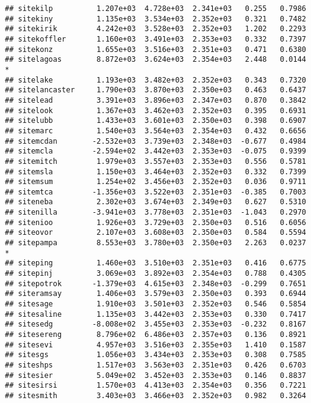 \documentclass[
]{article}
\begin{document}
\begin{verbatim}
## sitekilp          1.207e+03  4.728e+03  2.341e+03   0.255   0.7986  
## sitekiny          1.135e+03  3.534e+03  2.352e+03   0.321   0.7482  
## sitekirik         4.242e+03  3.528e+03  2.352e+03   1.202   0.2293  
## sitekoffler       1.160e+03  3.491e+03  2.353e+03   0.332   0.7397  
## sitekonz          1.655e+03  3.516e+03  2.351e+03   0.471   0.6380  
## sitelagoas        8.872e+03  3.624e+03  2.354e+03   2.448   0.0144 *
## sitelake          1.193e+03  3.482e+03  2.352e+03   0.343   0.7320  
## sitelancaster     1.790e+03  3.870e+03  2.350e+03   0.463   0.6437  
## sitelead          3.391e+03  3.896e+03  2.347e+03   0.870   0.3842  
## sitelook          1.367e+03  3.462e+03  2.352e+03   0.395   0.6931  
## sitelubb          1.433e+03  3.601e+03  2.350e+03   0.398   0.6907  
## sitemarc          1.540e+03  3.564e+03  2.354e+03   0.432   0.6656  
## sitemcdan        -2.532e+03  3.739e+03  2.348e+03  -0.677   0.4984  
## sitemcla         -2.594e+02  3.442e+03  2.353e+03  -0.075   0.9399  
## sitemitch         1.979e+03  3.557e+03  2.353e+03   0.556   0.5781  
## sitemsla          1.150e+03  3.464e+03  2.352e+03   0.332   0.7399  
## sitemsum          1.254e+02  3.456e+03  2.352e+03   0.036   0.9711  
## sitemtca         -1.356e+03  3.522e+03  2.351e+03  -0.385   0.7003  
## siteneba          2.302e+03  3.674e+03  2.349e+03   0.627   0.5310  
## sitenilla        -3.941e+03  3.778e+03  2.351e+03  -1.043   0.2970  
## sitenioo          1.926e+03  3.729e+03  2.350e+03   0.516   0.6056  
## siteovor          2.107e+03  3.608e+03  2.350e+03   0.584   0.5594  
## sitepampa         8.553e+03  3.780e+03  2.350e+03   2.263   0.0237 *
## siteping          1.460e+03  3.510e+03  2.351e+03   0.416   0.6775  
## sitepinj          3.069e+03  3.892e+03  2.354e+03   0.788   0.4305  
## sitepotrok       -1.379e+03  4.615e+03  2.348e+03  -0.299   0.7651  
## siteramsay        1.406e+03  3.579e+03  2.350e+03   0.393   0.6944  
## sitesage          1.910e+03  3.501e+03  2.352e+03   0.546   0.5854  
## sitesaline        1.135e+03  3.442e+03  2.353e+03   0.330   0.7417  
## sitesedg         -8.008e+02  3.455e+03  2.353e+03  -0.232   0.8167  
## sitesereng        8.796e+02  6.486e+03  2.357e+03   0.136   0.8921  
## sitesevi          4.957e+03  3.516e+03  2.355e+03   1.410   0.1587  
## sitesgs           1.056e+03  3.434e+03  2.353e+03   0.308   0.7585  
## siteshps          1.517e+03  3.563e+03  2.351e+03   0.426   0.6703  
## sitesier          5.049e+02  3.452e+03  2.353e+03   0.146   0.8837  
## sitesirsi         1.570e+03  4.413e+03  2.354e+03   0.356   0.7221  
## sitesmith         3.403e+03  3.466e+03  2.352e+03   0.982   0.3264  

\end{verbatim}
\end{document}
